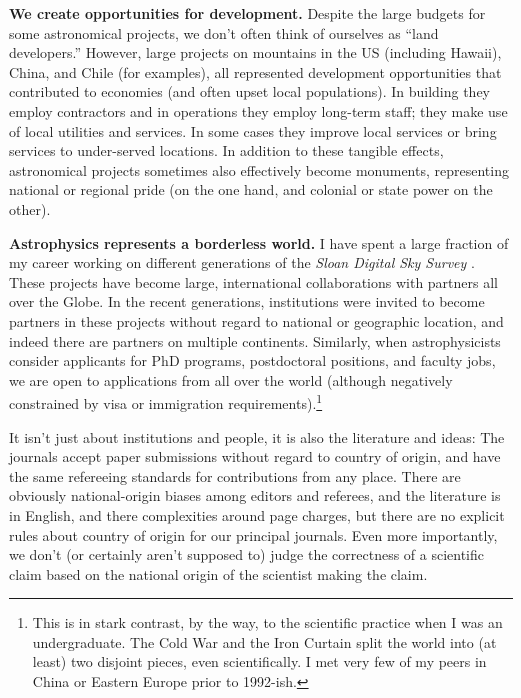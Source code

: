 \documentclass{article}
\newcommand{\paragraphskip}{\medskip}
\renewcommand{\paragraph}[1]{\par\paragraphskip\noindent\textbf{#1}}
\begin{document}
\paragraph{We create opportunities for development.}
Despite the large budgets for some astronomical projects, we don't often think of ourselves as ``land developers.''
However, large projects on mountains in the US (including Hawai{\textquotesingle}i), China, and Chile (for examples), all represented development opportunities that contributed to economies (and often upset local populations).
In building they employ contractors and in operations they employ long-term staff; they make use of local utilities and services.
In some cases they improve local services or bring services to under-served locations.
In addition to these tangible effects, astronomical projects sometimes also effectively become monuments, representing national or regional pride (on the one hand, and colonial or state power on the other).

\paragraph{Astrophysics represents a borderless world.}
I have spent a large fraction of my career working on different generations of the \textsl{Sloan Digital Sky Survey} \cite{sdss, sdssiii, sdssiv, sdssv}.
These projects have become large, international collaborations with partners all over the Globe.
In the recent generations, institutions were invited to become partners in these projects without regard to national or geographic location, and indeed there are partners on multiple continents.
Similarly, when astrophysicists consider applicants for PhD programs, postdoctoral positions, and faculty jobs, we are open to applications from all over the world (although negatively constrained by visa or immigration requirements).\footnote{%
This is in stark contrast, by the way, to the scientific practice when I was an undergraduate.
The Cold War and the Iron Curtain split the world into (at least) two disjoint pieces, even scientifically.
I met very few of my peers in China or Eastern Europe prior to 1992-ish.}

It isn't just about institutions and people, it is also the literature and ideas:
The journals accept paper submissions without regard to country of origin, and have the same refereeing standards for contributions from any place.
There are obviously national-origin biases among editors and referees, and the literature is in English, and there complexities around page charges, but there are no explicit rules about country of origin for our principal journals.
Even more importantly, we don't (or certainly aren't supposed to) judge the correctness of a scientific claim based on the national origin of the scientist making the claim.
\end{document}
